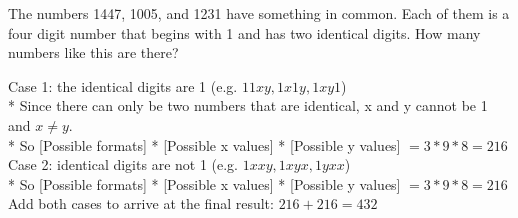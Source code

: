 \question 
The numbers 1447, 1005, and 1231 have something in common. Each of them 
is a four digit number that begins with 1 and has two identical digits. 
How many numbers like this are there?
\begin{solution}[.5 in]
Case 1: the identical digits are 1 (e.g. $11xy, 1x1y, 1xy1$) \\*
Since there can only be two numbers that are identical, x and y cannot 
be 1 and $x \neq y$. \\*
So [Possible formats] * [Possible x values] * [Possible y values] $= 
3 * 9 * 8 = 216$ \\
Case 2: identical digits are not 1 (e.g. $1xxy, 1xyx, 1yxx$) \\* So 
[Possible formats] * [Possible x values] * [Possible y values] 
$= 3 * 9 * 8 = 216$ \\
Add both cases to arrive at the final result: $216 + 216 = 432$
\end{solution}
